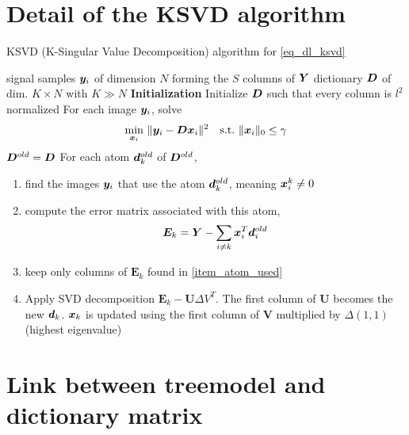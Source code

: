 \section{Detail of the \ac{KSVD} algorithm}\label{sec_ksvd_detail}
\begin{algorithm}
    \caption{\ac{KSVD} (K-Singular Value Decomposition) algorithm for \eqref{eq_dl_ksvd}}\label{alg_ksvd}
  \begin{algorithmic}[1]
    \Input signal samples $\bm{y}_i$ of dimension $N$ forming the $S$ columns of $\bm{Y}$
    \Output dictionary $\bm{D}$ of dim. $K \times N$ with $K \gg N$
    \State \textbf{Initialization} Initialize $\bm{D}$ such that every column is $l^2$ normalized
	\State For each image $\bm{y}_i$, solve \label{alg_ksvd_sparse_coding}
		\begin{align*}
			\quad \min_{\bm{x}_i}~ & \lVert \bm{y}_i-\bm{D}\bm{x}_i\rVert^2 \quad \text{s.t.}~ \lVert \bm{x}_i \rVert_0 \le \gamma
		\end{align*}
	\State $\bm{D}^{old} = \bm{D}$
	\State For each atom $\bm{d}_k^{old}$ of $\bm{D}^{old}$, \label{alg_ksvd_dict_update}
	\begin{enumerate}[leftmargin=15mm,label=(\alph*)]
		\item find the images $\bm{y}_i$ that use the atom $\bm{d}_k^{old}$, meaning $\bm{x}_i^k \ne 0$\label{item_atom_used}
		\item compute the error matrix associated with this atom,
		\begin{align*}
			\bm{E}_k = \bm{Y}-\sum_{i\ne k} \bm{x}_i^T\bm{d}_i^{old}
		\end{align*}
		\item keep only columns of $\bm{E}_k$ found in \cref{item_atom_used}
		\item Apply SVD decomposition $\bm{E}_k - \bm{U} \Delta V^T$. The first column of $\bm{U}$ becomes the new $\bm{d}_k$. $\bm{x}_k$ is updated using the first column of $\bm{V}$ multiplied by $\Delta(1,1)$ (highest eigenvalue)
	\end{enumerate}
    \EndWhile
  \end{algorithmic}
\end{algorithm}



\FloatBarrier
\section{Link between \gls{treemodel} and dictionary matrix}\label{sec_matrix_vs_tree} 

